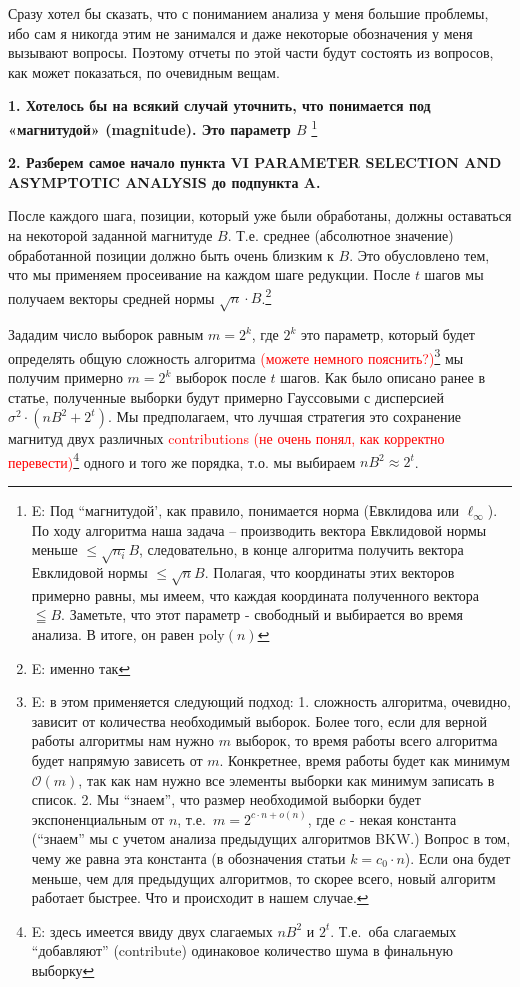 \documentclass[a4paper,11pt]{article}
\newcommand{\bigO}{\mathcal{O}}
\newcommand{\smallo}{o} %
\newcommand*{\poly}{\ensuremath{\mathrm{poly}}}
\begin{document}
	


Сразу хотел бы сказать, что с пониманием анализа у меня большие проблемы, ибо сам я никогда этим не занимался и даже некоторые обозначения у меня вызывают вопросы. Поэтому отчеты по этой части будут состоять из вопросов, как может показаться, по очевидным вещам.

\textbf{1. Хотелось бы на всякий случай уточнить, что понимается под «магнитудой» (magnitude). Это параметр $B$ } \footnote{E: 
Под ``магнитудой', как правило, понимается норма (Евклидова или $\ell_\infty$). По ходу алгоритма наша задача -- производить вектора  Евклидовой нормы меньше $\leq \sqrt{n_i}B$, следовательно, в конце алгоритма получить вектора Евклидовой нормы $ \leq \sqrt{n}B$. Полагая, что координаты этих векторов примерно равны, мы имеем, что каждая координата полученного вектора $\leqq B$. Заметьте, что этот параметр - свободный и выбирается во время анализа. В итоге, он равен $\poly(n)$
} 

\textbf{2. Разберем самое начало пункта VI PARAMETER SELECTION AND ASYMPTOTIC ANALYSIS до подпункта A.}

После каждого шага, позиции, который уже были обработаны, должны оставаться на некоторой заданной магнитуде $B$. Т.е. среднее (абсолютное значение) обработанной позиции должно быть очень близким к $B$. Это обусловлено тем, что мы применяем просеивание на каждом шаге редукции. После $t$ шагов мы получаем векторы средней нормы $\sqrt{n}\cdot B$.\footnote{E: именно так} 

Зададим число выборок равным ${m=2^k}$, где $2^k$ это параметр, который будет определять общую сложность алгоритма \textcolor{red}{(можете немного пояснить?)}\footnote{E: в этом применяется следующий подход: 1. сложность алгоритма, очевидно, зависит от количества необходимый выборок. Более того, если для верной работы алгоритмы нам нужно $m$ выборок, то время работы всего алгоритма будет напрямую зависеть от $m$. Конкретнее, время работы будет как минимум $\bigO(m)$, так как нам нужно все элементы выборки как минимум записать в список. 2. Мы ``знаем'', что размер необходимой выборки  будет экспоненциальным от $n$, т.е.\ $m = 2^{c \cdot n + \smallo(n) }$, где $c$ - некая константа (``знаем'' мы с учетом анализа предыдущих алгоритмов BKW.) Вопрос в том, чему же равна эта константа (в обозначения статьи $k=c_0 \cdot n$). Если она будет меньше, чем для предыдущих алгоритмов, то скорее всего, новый алгоритм работает быстрее. Что и происходит в нашем случае.}
мы получим примерно $m=2^k$ выборок после $t$ шагов. Как было описано ранее в статье, полученные выборки будут примерно Гауссовыми с дисперсией $\sigma^2\cdot(nB^2+2^t)$. Мы предполагаем, что лучшая стратегия это сохранение магнитуд двух различных \textcolor{red}{contributions (не очень понял, как корректно перевести)}\footnote{E: здесь имеется ввиду двух слагаемых $nB^2$ и $2^t$. Т.е.\ оба слагаемых ``добавляют'' (contribute) одинаковое количество шума в финальную выборку} одного и того же порядка, т.о. мы выбираем $nB^2 \approx 2^t$.
\end{document}
